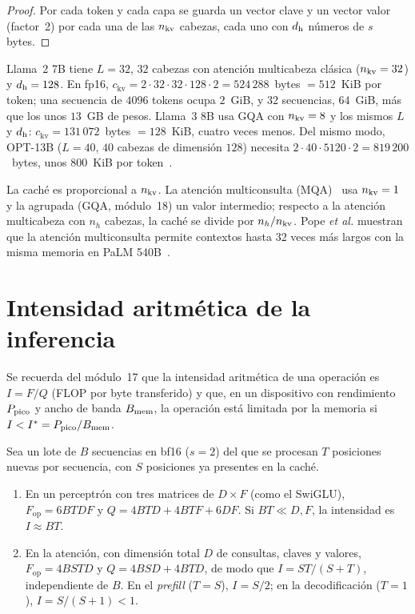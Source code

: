 \begin{proof}
Por cada token y cada capa se guarda un vector clave y un vector valor (factor~2) por cada una de las $n_{\mathrm{kv}}$ cabezas, cada uno con $d_{\mathrm{h}}$ números de $s$ bytes.
\end{proof}

\begin{ejemplo}\label{ej:llama}
Llama~2 7B tiene $L=32$, $32$ cabezas con atención multicabeza clásica ($n_{\mathrm{kv}}=32$) y $d_{\mathrm{h}}=128$. En fp16, $c_{\mathrm{kv}}=2\cdot 32\cdot 32\cdot 128\cdot 2=524\,288$~bytes $=512$~KiB por token; una secuencia de $4096$ tokens ocupa $2$~GiB, y 32 secuencias, $64$~GiB, más que los unos $13$~GB de pesos. Llama~3 8B usa GQA con $n_{\mathrm{kv}}=8$ y los mismos $L$ y $d_{\mathrm{h}}$: $c_{\mathrm{kv}}=131\,072$~bytes $=128$~KiB, cuatro veces menos. Del mismo modo, OPT-13B ($L=40$, $40$ cabezas de dimensión $128$) necesita $2\cdot 40\cdot 5120\cdot 2=819\,200$~bytes, unos 800~KiB por token~\cite[§3]{kwon}.
\end{ejemplo}

\begin{observacion}
La caché es proporcional a $n_{\mathrm{kv}}$. La atención multiconsulta (MQA)~\cite{shazeer} usa $n_{\mathrm{kv}}=1$ y la agrupada (GQA, módulo~18) un valor intermedio; respecto a la atención multicabeza con $n_h$ cabezas, la caché se divide por $n_h/n_{\mathrm{kv}}$. Pope \emph{et al.} muestran que la atención multiconsulta permite contextos hasta 32 veces más largos con la misma memoria en PaLM 540B~\cite{pope}.
\end{observacion}

\section{Intensidad aritmética de la inferencia}

Se recuerda del módulo~17 que la intensidad aritmética de una operación es $I=F/Q$ (FLOP por byte transferido) y que, en un dispositivo con rendimiento $P_{\mathrm{pico}}$ y ancho de banda $B_{\mathrm{mem}}$, la operación está limitada por la memoria si $I<I^{\ast}=P_{\mathrm{pico}}/B_{\mathrm{mem}}$.

\begin{proposicion}\label{prop:intensidad-capas}
Sea un lote de $B$ secuencias en bf16 ($s=2$) del que se procesan $T$ posiciones nuevas por secuencia, con $S$ posiciones ya presentes en la caché.
\begin{enumerate}[label=(\alph*)]
  \item En un perceptrón con tres matrices de $D\times F$ (como el SwiGLU), $F_{\mathrm{op}}=6BTDF$ y $Q=4BTD+4BTF+6DF$. Si $BT\ll D,F$, la intensidad es $I\approx BT$.
  \item En la atención, con dimensión total $D$ de consultas, claves y valores, $F_{\mathrm{op}}=4BSTD$ y $Q=4BSD+4BTD$, de modo que $I=ST/(S+T)$, independiente de $B$. En el \emph{prefill} ($T=S$), $I=S/2$; en la decodificación ($T=1$), $I=S/(S+1)<1$.
\end{enumerate}
\end{proposicion}

